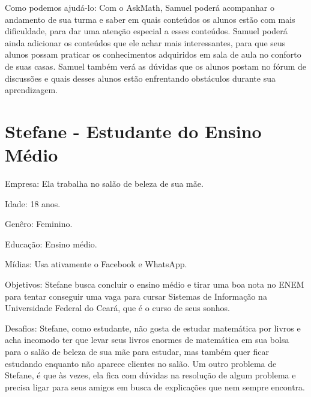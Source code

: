 Como podemos ajudá-lo: Com o AskMath, Samuel poder\'a acompanhar o andamento de sua turma e saber em quais conteúdos os alunos est\~ao com mais dificuldade, para dar uma aten\c{c}\~ao especial a 
esses conte\'udos. Samuel poderá ainda adicionar os conteúdos que ele achar mais interessantes, para que seus alunos possam praticar os conhecimentos adquiridos em sala de aula no conforto de suas 
casas. Samuel tamb\'em ver\'a as dúvidas que os alunos postam no fórum de discuss\~oes e quais desses alunos est\~ao enfrentando obstáculos durante sua aprendizagem.

\section{Stefane - Estudante do Ensino Médio}

\begin{figure}[h!]
  \centering
\end{figure}



Empresa: Ela trabalha no salão de beleza de sua mãe.

Idade: 18 anos.

Genêro: Feminino.

Educação: Ensino médio.

Mídias: Usa ativamente o Facebook e WhatsApp.

Objetivos: Stefane busca concluir o ensino médio e tirar uma boa nota no ENEM 
para tentar conseguir uma vaga para cursar Sistemas de Informação na Universidade Federal do Cear\'a, que é 
o curso de seus sonhos.

Desafios: Stefane, como estudante, não gosta de estudar matemática por livros e acha incomodo ter que levar seus livros enormes de matemática em sua bolsa para o salão de beleza de sua mãe para 
estudar, mas tamb\'em quer ficar estudando enquanto não aparece clientes no salão. Um outro problema de Stefane, é que às vezes, ela fica com dúvidas na resolução de algum problema e precisa ligar 
para seus amigos em busca de explicações que nem sempre encontra.


